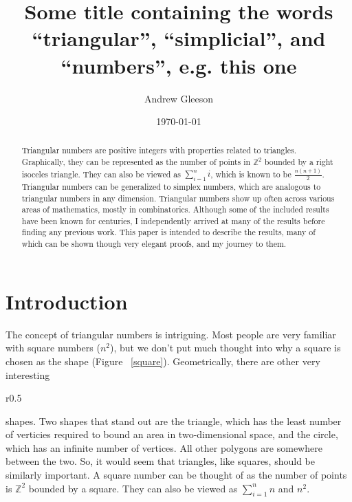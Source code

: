 \documentclass{article}
\title{Some title containing the words ``triangular'', ``simplicial'', and ``numbers'', e.g. this one}
\date{\today}
\author{Andrew Gleeson}
\begin{document}
\maketitle

\begin{abstract}

Triangular numbers are positive integers with properties related to triangles. Graphically, they can be represented as the number of points in $\mathbb{Z}^{2}$ bounded by a right isoceles triangle.  They can also be viewed as $\sum_{i=1}^n i$, which is known to be  $\frac{n(n+1)}{2}$. Triangular numbers can be generalized to simplex numbers, which are analogous to triangular numbers in any dimension. Triangular numbers show up often across various areas of mathematics, mostly in combinatorics. Although some of the included results have been known for centuries, I independently arrived at many of the results before finding any previous work. This paper is intended to describe the results, many of which can be shown though very elegant proofs, and my journey to them.

\end{abstract}

\section{Introduction}

The concept of triangular numbers is intriguing. Most people are very
familiar with square numbers ($n^2$), but we don't put much thought
into why a square is chosen as the shape (Figure ~\ref{square}). Geometrically, there are
other very interesting \begin{wrapfigure}{r}{0.5\textwidth}

\centering
{}
\caption{$3^2 = 9$\label{square}}

\end{wrapfigure}
shapes. Two shapes that stand out are the
triangle, which has the least number of verticies required to bound an area in two-dimensional space, and the circle, which has an infinite
number of vertices. All other polygons are somewhere between the
two. So, it would seem that triangles, like squares, should be similarly important.
A square number can be thought of as the number of points is $\mathbb{Z}^2$ bounded by a square. They can also be viewed as $\sum_{i=1}^{n}n$ and $n^2$.
\end{document}
